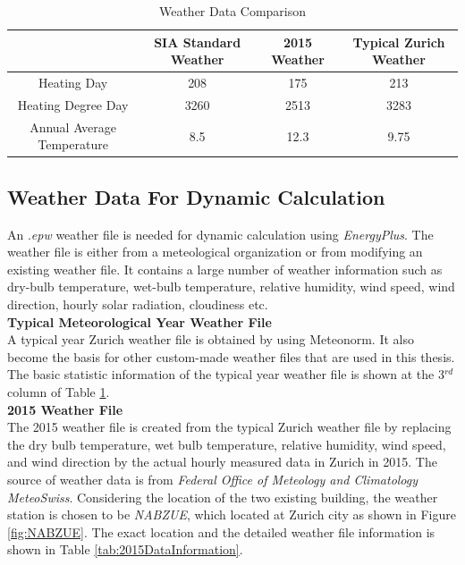 \documentclass[a4paper, oneside]{discothesis}
\begin{document}
				\begin{table}[htbp]
				  \centering
				\caption{Weather Data Comparison}
				    \begin{tabular}{|c|c|c|c|}
				    \toprule
				         & \multicolumn{1}{c}{SIA Standard Weather} & 2015 Weather & Typical Zurich Weather\\
				    \midrule
				    Heating Day & 208  & 175 & 213\\
				    \midrule
				    Heating Degree Day & 3260 & 2513 & 3283\\
				    \midrule
				    Annual Average Temperature & 8.5  & 12.3 & 9.75\\
				    \bottomrule
				    \end{tabular}%
				  \label{tab:StaticWeatherCompare}%
				\end{table}%


			\subsection{Weather Data For Dynamic Calculation}
				An .\textit{epw} weather file is needed for dynamic calculation using \textit{EnergyPlus}. The weather file is either from a meteological organization or from modifying an existing weather file. It contains a large number of weather information such as dry-bulb temperature, wet-bulb temperature, relative humidity, wind speed, wind direction, hourly solar radiation, cloudiness etc.\\

			\textbf{Typical Meteorological Year Weather File}\\
				A typical year Zurich weather file is obtained by using Meteonorm. It also become the basis for other custom-made weather files that are used in this thesis. The basic statistic information of the typical year weather file is shown at the 3$^{rd}$ column of Table \ref{tab:StaticWeatherCompare}. \\

			\textbf{2015 Weather File}\\
				The 2015 weather file is created from the typical Zurich weather file by replacing the dry bulb temperature, wet bulb temperature, relative humidity, wind speed, and wind direction by the actual hourly measured data in Zurich in 2015. The source of weather data is from \textit{Federal Office of Meteology and Climatology MeteoSwiss}. Considering the location of the two existing building, the weather station is chosen to be \textit{NABZUE}, which located at Zurich city as shown in Figure \ref{fig:NABZUE}. The exact location and the detailed weather file information is shown in Table \ref{tab:2015DataInformation}.
\end{document}
